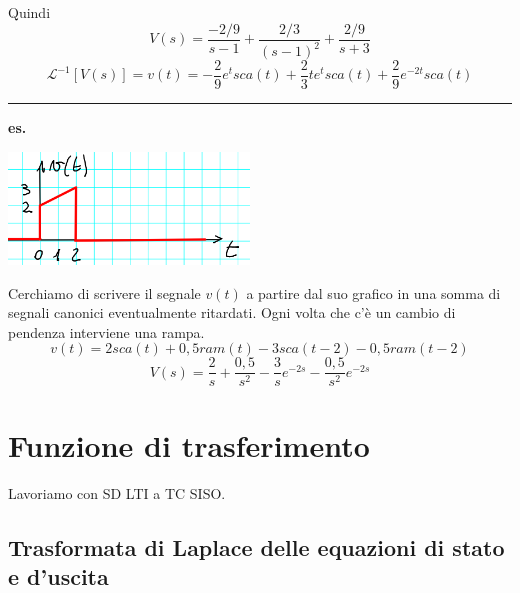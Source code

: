 Quindi
\[
    V(s) = \frac{-2/9}{s-1} + \frac{2/3}{(s-1)^2} + \frac{2/9}{s+3}
\]
\[
    \mathcal{L}^{-1}[V(s)] = v(t) = -\frac{2}{9} e^{t} sca(t) + \frac{2}{3} t e^{t} sca(t) + \frac{2}{9}e^{-2t} sca(t)
\]
\rule{\textwidth}{0,4pt}
\newline
\newline
\textbf{es.}
\begin{center}
    \includegraphics[height=3cm]{../lezione6/img1.PNG}
\end{center}
Cerchiamo di scrivere il segnale $v(t)$ a partire dal suo grafico in una somma di segnali canonici eventualmente ritardati.\newline
Ogni volta che c'è un cambio di pendenza interviene una rampa.\newline
\[
    v(t)= 2 sca(t) + 0,5 ram(t) - 3 sca(t-2) - 0,5 ram(t-2)
\] 
\[
    V(s) = \frac{2}{s} + \frac{0,5}{s^2} - \frac{3}{s}e^{-2s} - \frac{0,5}{s^2}e^{-2s} 
\]
\newpage
\section{Funzione di trasferimento}
Lavoriamo con SD LTI a TC SISO.
\subsection{Trasformata di Laplace delle equazioni di stato e d'uscita}
